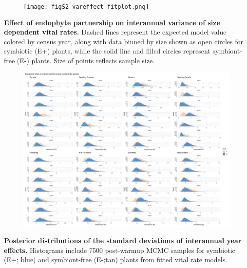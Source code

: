 \documentclass[12pt]{article}
\begin{document}
\begin{figure}
	\centering
	\texttt{[image: figS2\_vareffect\_fitplot.png]}
\end{figure}
 \textbf{Effect of endophyte partnership on interannual variance of size dependent vital rates.} Dashed lines represent the expected model value colored by census year,  along with data binned by size shown as open circles for symbiotic (E+) plants, while the solid line and filled circles represent symbiont-free (E-) plants. Size of points reflects sample size.
\newpage

\begin{figure}
	\centering
	\includegraphics[width=\linewidth]{figS3_endo_sigmayear_histograms.png}
\end{figure}
 \textbf{Posterior distributions of the standard deviations of interannual year effects.} Histograms include 7500 post-warmup MCMC samples for symbiotic (E+; blue) and symbiont-free (E-;tan) plants from fitted vital rate models.
\newpage
\end{document}
